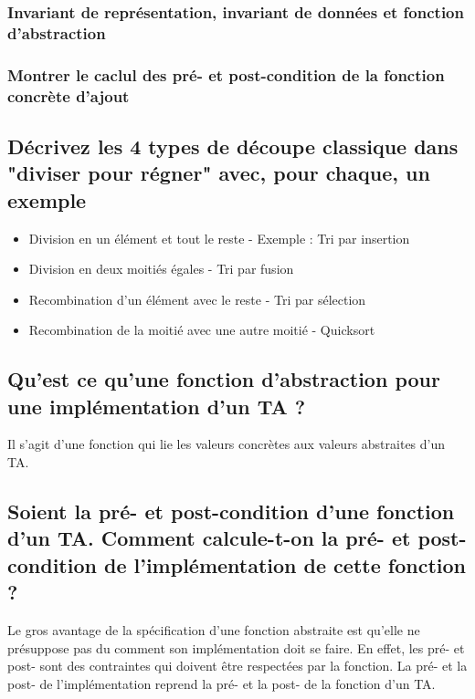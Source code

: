\documentclass[11pt]{article}
\begin{document}
\subsubsection{Invariant de représentation, invariant de données et fonction d'abstraction}

\subsubsection{Montrer le caclul des pré- et post-condition de la fonction concrète d'ajout}

\subsection{Décrivez les 4 types de découpe classique dans "diviser pour régner" avec, pour chaque, un exemple}

\begin{itemize}
	\item Division en un élément et tout le reste - Exemple : Tri par insertion
	\item Division en deux moitiés égales - Tri par fusion
	\item Recombination d'un élément avec le reste - Tri par sélection
	\item Recombination de la moitié avec une autre moitié - Quicksort
\end{itemize}

\subsection{Qu'est ce qu'une fonction d'abstraction pour une implémentation d'un TA ?}

Il s'agit d'une fonction qui lie les valeurs concrètes aux valeurs abstraites d’un TA.

\subsection{Soient la pré- et post-condition d'une fonction d'un TA. Comment calcule-t-on la pré- et post-condition de l'implémentation de cette fonction ?}

Le gros avantage de la spécification d’une fonction abstraite est qu’elle ne présuppose pas du comment son implémentation doit se faire. En effet, les pré- et post- sont des contraintes qui doivent être respectées par la fonction. La pré- et la post- de l’implémentation reprend la pré- et la post- de la fonction d’un TA.
\end{document}
